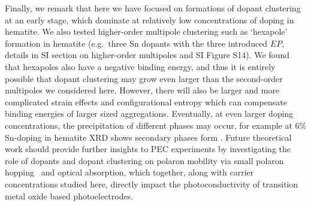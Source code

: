 Finally, we remark that here we have focused on formations of dopant clustering at an early stage, which dominate at relatively low concentrations of doping in hematite. We also tested higher-order multipole clustering such as `hexapole' formation in hematite (e.g.\ three Sn dopants with the three introduced $EP$, details in SI section on higher-order multipoles and SI Figure S14). We found that hexapoles also have a negative binding energy, and thus
it is entirely possible that dopant clustering may grow even larger than the second-order multipoles we considered here.
However, there will also be larger and more complicated strain effects and configurational entropy which can compensate binding energies of larger sized aggregations.
Eventually, at even larger doping concentrations, the precipitation of different phases may occur, for example at 6\% Sn-doping in hematite XRD shows  secondary phases form \cite{tian2020electronic}.
Future theoretical work should provide further insights to PEC experiments by investigating the role of dopants and dopant clustering on polaron mobility via small polaron hopping~\cite{wu2018combining,zhang2018unconventional,smart2017effect,smart2018mechanistic}
and optical absorption\cite{smart2019optical,wheeler2019combined,zhou2020interstitial}, which together, along with carrier concentrations studied here, directly impact the photoconductivity of transition metal oxide based photoelectrodes.


